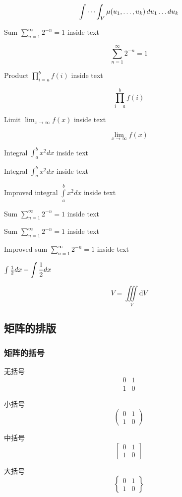 \documentclass[UTF8]{ctexart}
\begin{document}
$$\idotsint_V \mu(u_1,\dots,u_k) \,du_1 \dots du_k$$

Sum $\sum_{n=1}^{\infty} 2^{-n} = 1$ inside text

$$\sum_{n=1}^{\infty} 2^{-n} = 1$$

Product $\prod_{i=a}^{b} f(i)$ inside text

$$\prod_{i=a}^{b} f(i)$$

Limit $\lim_{x\to\infty} f(x)$ inside text



$$\lim_{x\to\infty} f(x)$$

Integral $\int_{a}^{b} x^2 dx$ inside text

Integral $\int\nolimits_{a}^{b} x^2 dx$ inside text

Improved integral $\int\limits_{a}^{b} x^2 dx$ inside text

Sum $\sum_{n=1}^{\infty} 2^{-n} = 1$ inside text

Sum $\sum\nolimits_{n=1}^{\infty} 2^{-n} = 1$ inside text


Improved sum $\sum\limits_{n=1}^{\infty} 2^{-n} = 1$ inside text

$\int\frac{1}{2}dx - \mathlarger{ \int\frac{1}{2}dx}$


\[
V = \iiint \limits_{V} \mathrm{d} V
\]

\subsection{矩阵的排版}
\subsubsection{矩阵的括号}
无括号
\[
\begin{matrix}
0 & 1 \\
1 & 0 
\end{matrix}
\]

小括号
\[
\begin{pmatrix}
0 & 1 \\
1 & 0 
\end{pmatrix}
\]

中括号
\[
\begin{bmatrix}
0 & 1 \\
1 & 0 
\end{bmatrix}
\]

大括号
\[
\begin{Bmatrix}
0 & 1 \\
1 & 0 
\end{Bmatrix}
\]
\end{document}
